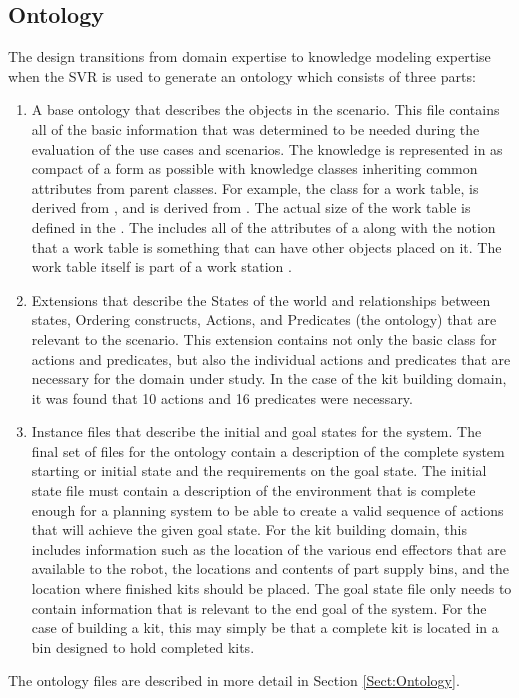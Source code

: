 \subsection{Ontology}
The design transitions from domain expertise to knowledge modeling expertise
when the SVR is used to generate an ontology which consists of three parts:
\begin{enumerate}
 \item A base ontology that describes the objects in the scenario. This file contains
all of the basic information that was determined to be needed during the evaluation of
the use cases and scenarios. The knowledge is represented in as compact of a form as
possible with knowledge classes inheriting common attributes from parent classes.
For example, the class for a work table,  is derived from
, and  is derived from . The actual size of the work table
is defined in the . The  includes all of the attributes
of a  along with the notion that a work table is something that can have
other objects placed on it. The work table itself is part of a work station .
 \item Extensions that describe the States of the world and relationships between states,
Ordering constructs, Actions, and Predicates (the  ontology)
that are relevant to the scenario. This extension contains not only the basic class for
actions and predicates, but also the individual actions and predicates that are necessary
for the domain under study. In the case of the kit building domain, it was found that
10 actions and 16 predicates were necessary.
 \item Instance files that describe the initial and goal states for the system. The final set
of files for the ontology contain a description of the complete system starting or initial state and the
requirements on the goal state. The initial state file must contain a description of the environment that
is complete enough for a planning system to be able to create a valid sequence of actions that will achieve
the given goal state. For the kit building domain, this includes information such as the location of the
various end effectors that are available to the robot, the locations and contents of part supply bins, and
the location where finished kits should be placed. The goal state file only needs to contain information that
is relevant to the end goal of the system. For the case of building a kit, this may simply be that a complete
kit is located in a bin designed to hold completed kits.
\end{enumerate}
The ontology files are
described in more detail in Section \ref{Sect:Ontology}.

